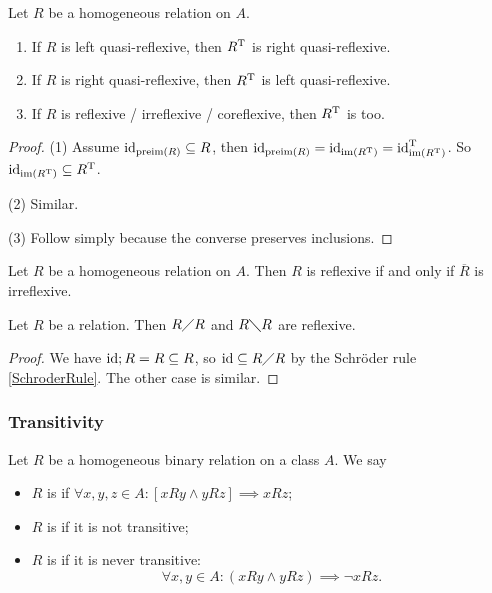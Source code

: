 \begin{lemma}
Let $R$ be a homogeneous relation on $A$.
\begin{enumerate}
\item If $R$ is left quasi-reflexive, then $R^{\mathrm{T}}$ is right quasi-reflexive.
\item If $R$ is right quasi-reflexive, then $R^{\mathrm{T}}$ is left quasi-reflexive.
\item If $R$ is reflexive / irreflexive / coreflexive, then $R^{\mathrm{T}}$ is too.
\end{enumerate}
\end{lemma}
\begin{proof}
(1) Assume $\operatorname{id}_{\operatorname{preim}(R)} \subseteq R$, then $\operatorname{id}_{\operatorname{preim}(R)} = \operatorname{id}_{\operatorname{im}(R^{\mathrm{T}})} = \operatorname{id}_{\operatorname{im}(R^{\mathrm{T}})}^{\mathrm{T}}$. So $\operatorname{id}_{\operatorname{im}(R^{\mathrm{T}})} \subseteq R^{\mathrm{T}}$.

(2) Similar.

(3) Follow simply because the converse preserves inclusions.
\end{proof}

\begin{lemma} \label{reflexiveIrreflexive}
Let $R$ be a homogeneous relation on $A$. Then $R$ is reflexive \textup{if and only if} $\overline{R}$ is irreflexive.
\end{lemma}

\begin{lemma}
Let $R$ be a relation. Then $R\diagup R$ and $R\diagdown R$ are reflexive.
\end{lemma}
\begin{proof}
We have $\operatorname{id}; R = R \subseteq R$, so $\operatorname{id} \subseteq R\diagup R$ by the Schröder rule \ref{SchroderRule}. The other case is similar.
\end{proof}

\subsubsection{Transitivity}
\begin{definition}
Let $R$ be a homogeneous binary relation on a class $A$. We say
\begin{itemize}
\item $R$ is  if $\forall x,y,z\in A: [xRy \land yRz] \implies xRz$;
\item $R$ is  if it is not transitive;
\item $R$ is  if it is never transitive:
\[ \forall x,y\in A: (xRy\land yRz) \implies \neg xRz.\]
\end{itemize}
\end{definition}

